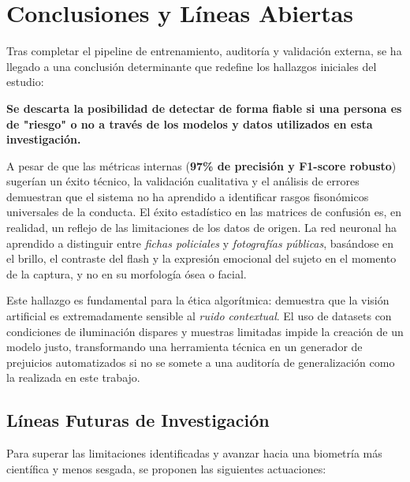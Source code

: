 \section{Conclusiones y Líneas Abiertas}

Tras completar el pipeline de entrenamiento, auditoría y validación externa, se ha llegado a una conclusión determinante que redefine los hallazgos iniciales del estudio:

\textbf{Se descarta la posibilidad de detectar de forma fiable si una persona es de "riesgo" o no a través de los modelos y datos utilizados en esta investigación.}

A pesar de que las métricas internas (\textbf{97\% de precisión y F1-score robusto}) sugerían un éxito técnico, la validación cualitativa y el análisis de errores demuestran que el sistema no ha aprendido a identificar rasgos fisonómicos universales de la conducta. El éxito estadístico en las matrices de confusión es, en realidad, un reflejo de las limitaciones de los datos de origen. La red neuronal ha aprendido a distinguir entre \textit{fichas policiales} y \textit{fotografías públicas}, basándose en el brillo, el contraste del flash y la expresión emocional del sujeto en el momento de la captura, y no en su morfología ósea o facial.

Este hallazgo es fundamental para la ética algorítmica: demuestra que la visión artificial es extremadamente sensible al \textit{ruido contextual}. El uso de datasets con condiciones de iluminación dispares y muestras limitadas impide la creación de un modelo justo, transformando una herramienta técnica en un generador de prejuicios automatizados si no se somete a una auditoría de generalización como la realizada en este trabajo.

\subsection{Líneas Futuras de Investigación}
Para superar las limitaciones identificadas y avanzar hacia una biometría más científica y menos sesgada, se proponen las siguientes actuaciones:

